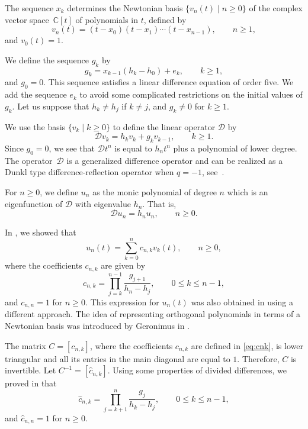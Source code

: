 \documentclass[10pt,a4paper]{amsart}
\def\cD{\mathcal D}
\def\hc{\hat c}
\numberwithin{equation}{section}
\begin{document}
The sequence $x_k$ determines the Newtonian basis $\{v_n(t) \mid n\ge 0\}$
of the complex vector space~${\mathbb C}[t]$ of polynomials in $t$, defined by
\begin{equation}\label{eq:Newton}
	v_n(t)= (t-x_0)(t-x_1)\cdots (t-x_{n-1}), \qquad n \ge 1,
\end{equation}
and $v_0(t)=1$.

We define the sequence $g_k$ by
\begin{equation*} %
g_k= x_{k-1} (h_k- h_0) + e_k, \qquad k \ge 1,
\end{equation*}
and $g_0=0$.
This sequence satisfies a linear difference equation of order five. We add the sequence $e_k$ to avoid some complicated restrictions on the initial values of $g_k$. Let us suppose that $h_k \ne h_j$ if $k \ne j$, and $g_k \ne 0$ for $k \ge 1$.

We use the basis $\{v_k\mid k \ge 0\}$ to define the linear operator $\cD$ by
\begin{equation*}%
\cD v_k = h_k v_k + g_k v_{k-1}, \qquad k \ge 1.
\end{equation*}
	Since $g_0=0 $, we see that $\cD t^n$ is equal to $ h_n t^n $ plus a polynomial of lower degree.
The operator~$\cD$ is a generalized difference operator and can be realized
as a Dunkl type difference-reflection operator when $q=-1$, see~\cite{GenVZ2}.

	For $n \ge 0$, we define $u_n$ as the monic polynomial of degree $n$ which is an eigenfunction of $\cD$ with eigenvalue $h_n$. That is,
\begin{equation}\label{eq:eigenEq}
\cD u_n = h_n u_n, \qquad n \ge 0.
\end{equation}

 In \cite[p.~249]{Uni}, we showed that
\begin{equation*}%
 u_n(t) = \sum_{k=0}^n c_{n,k} v_k(t), \qquad n \ge 0,
\end{equation*}
 where the coefficients $ c_{n,k}$ are given by
 \begin{equation}\label{eq:cnk}
c_{n,k}=\prod_{j=k}^{n-1} \frac{g_{j+1}}{h_n -h_j}, \qquad 0 \le k \le n-1,
 \end{equation}
and $c_{n,n}=1$ for $n \ge 0$.
This expression for $u_n(t)$ was also obtained in \cite{VZ} using a different approach. The idea of representing orthogonal polynomials in terms of a Newtonian basis was introduced by Geronimus in \cite{Ger}.

The matrix $C=[c_{n,k}]$, where the coefficients $c_{n,k}$ are defined in \eqref{eq:cnk}, is lower triangular and all its entries in the main diagonal are equal to $1$. Therefore, $C$ is invertible.  Let $ C^{-1}=[{\hat c}_{n,k}]$. Using some properties of divided differences, we proved in \cite[p.~251]{Uni} that
\begin{equation*}%
  \hc_{n,k}=\prod_{j=k+1}^n \frac{g_j}{h_k - h_j}, \qquad 0 \le k \le n-1,
\end{equation*}
   and $\hc_{n,n}=1$ for $n \ge 0.$
\end{document}
